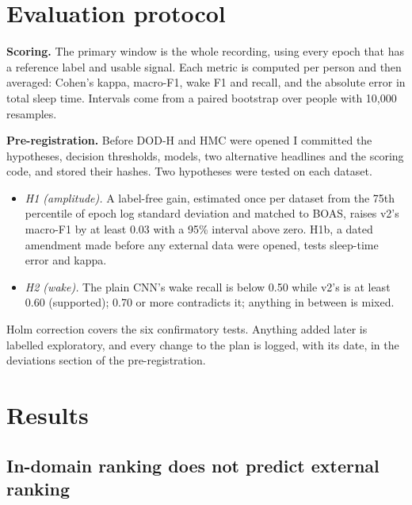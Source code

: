 \documentclass[10pt,twocolumn]{article}
\begin{document}
\section{Evaluation protocol}

\textbf{Scoring.} The primary window is the whole recording, using every epoch that has a reference
label and usable signal. Each metric is computed per person and then averaged: Cohen's kappa,
macro-F1, wake F1 and recall, and the absolute error in total sleep time. Intervals come from a
paired bootstrap over people with 10,000 resamples.

\textbf{Pre-registration.} Before DOD-H and HMC were opened I committed the hypotheses, decision
thresholds, models, two alternative headlines and the scoring code, and stored their hashes. Two
hypotheses were tested on each dataset.
\begin{itemize}
\item \emph{H1 (amplitude).} A label-free gain, estimated once per dataset from the 75th percentile of
epoch log standard deviation and matched to BOAS, raises v2's macro-F1 by at least 0.03 with a 95\%
interval above zero. H1b, a dated amendment made before any external data were opened, tests
sleep-time error and kappa.
\item \emph{H2 (wake).} The plain CNN's wake recall is below 0.50 while v2's is at least 0.60
(supported); 0.70 or more contradicts it; anything in between is mixed.
\end{itemize}
Holm correction covers the six confirmatory tests. Anything added later is labelled exploratory, and
every change to the plan is logged, with its date, in the deviations section of the pre-registration.

\section{Results}

\subsection{In-domain ranking does not predict external ranking}
\end{document}
